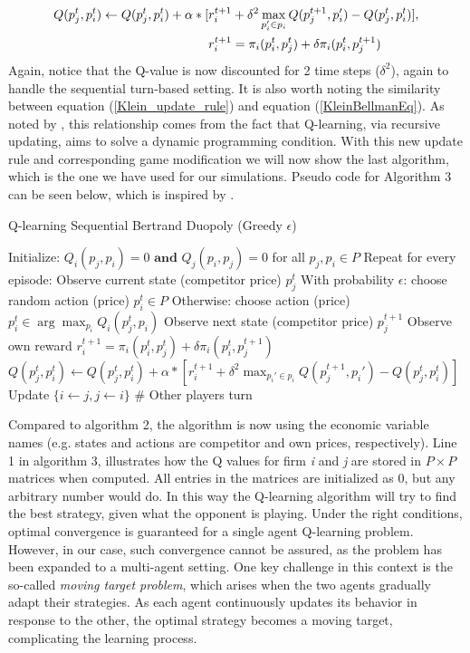 \documentclass{article}
\begin{document}
\begin{align}
\label{Klein_update_rule}
Q(p_j^t,p_i^t)\leftarrow Q(p_j^t,p_i^t)+\alpha *[&r_i^{t+1}+\delta^2 \max_{p_i'\in p_i} Q(p_j^{t+1},p_i') -Q(p_j^t,p_i^t)], \\
&r_i^{t+1} = \pi_i(p^t_i,p^t_j)+\delta\pi_i(p_i^t,p_j^{t+1}) \notag 
\end{align}
Again, notice that the Q-value is now discounted for 2 time steps ($\delta^2$), again to handle the sequential turn-based setting.
\newline 
It is also worth noting the similarity between equation (\ref{Klein_update_rule}) and equation (\ref{KleinBellmanEq}). As noted by \cite{Klein2021}, this relationship comes from the fact that Q-learning, via recursive updating, aims to solve a dynamic programming condition.
\newline 
With this new update rule and corresponding game modification we will now show the last algorithm, which is the one we have used for our simulations. Pseudo code for Algorithm 3 can be seen below, which is inspired by \cite{Julius2023}.  
\begin{algorithm}[H]
\caption{Q-learning Sequential Bertrand Duopoly (Greedy $\epsilon$)}
\begin{algorithmic}[1]
\State Initialize: \( Q_i(p_j, p_i) = 0 \textbf{ and } Q_j(p_i, p_j) = 0 \) for all \( p_j, p_i \in P \)
\State Repeat for every episode:
    \State Observe current state (competitor price) \( p_j^t \)
    \State With probability \( \epsilon \): choose random action (price) \( p_i^t \in P \)
    \State Otherwise: choose action (price)  \( p_i^t \in \arg \max_{p_i} Q_i(p_j^t, p_i) \)
    \State Observe next state (competitor price) \( p_j^{t+1} \)
    \State Observe own reward \(r_i^{t+1} = \pi_i(p^t_i,p^t_j)+\delta\pi_i(p_i^t,p_j^{t+1}) \) 
    \State \( Q(p_j^t,p_i^t)\gets Q(p_j^t,p_i^t)+\alpha *[r_i^{t+1}+\delta^2 \max_{p_i'\in p_i} Q(p_j^{t+1},p_i') -Q(p_j^t,p_i^t)]\)
    \State Update $\{i\leftarrow j,j\leftarrow i\}$ \# Other players turn
\EndFor
\end{algorithmic}
\end{algorithm}
Compared to algorithm 2, the algorithm is now using the economic variable names (e.g. states and actions are competitor and own prices, respectively).
Line 1 in algorithm 3, illustrates how the Q values for firm \textit{i} and \textit{j}  are stored in $P\times P$ matrices when computed. All entries in the matrices are initialized as 0, but any arbitrary number would do.
In this way the Q-learning algorithm will try to find the best strategy, given what the opponent is playing.
\newline
Under the right conditions, optimal convergence is guaranteed for a single agent Q-learning problem. However, in our case, such convergence cannot be assured, as the problem has been expanded to a multi-agent setting. One key challenge in this context is the so-called \textit{moving target problem}, which arises when the two agents gradually adapt their strategies. As each agent continuously updates its behavior in response to the other, the optimal strategy becomes a moving target, complicating the learning process.
\end{document}
